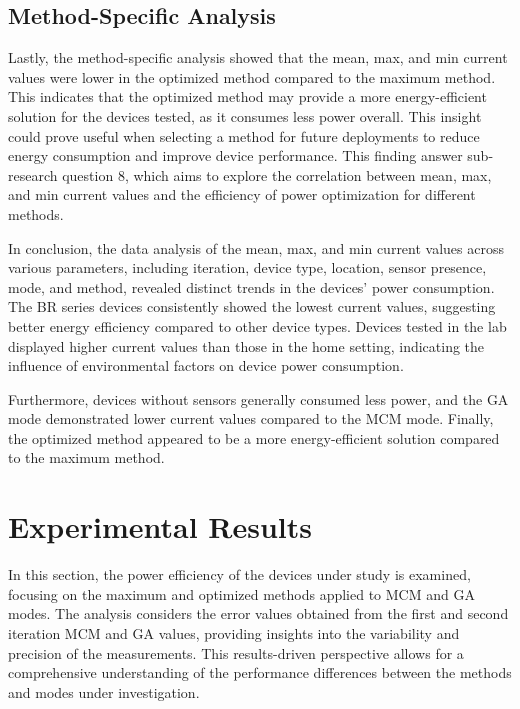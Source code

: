 \subsection{Method-Specific Analysis}

Lastly, the method-specific analysis showed that the mean, max, and min current values were lower in the optimized method compared to the maximum method. This indicates that the optimized method may provide a more energy-efficient solution for the devices tested, as it consumes less power overall. This insight could prove useful when selecting a method for future deployments to reduce energy consumption and improve device performance. This finding answer sub-research question 8, which aims to explore the correlation between mean, max, and min current values and the efficiency of power optimization for different methods.

\vspace{3mm}
In conclusion, the data analysis of the mean, max, and min current values across various parameters, including iteration, device type, location, sensor presence, mode, and method, revealed distinct trends in the devices' power consumption. The BR series devices consistently showed the lowest current values, suggesting better energy efficiency compared to other device types. Devices tested in the lab displayed higher current values than those in the home setting, indicating the influence of environmental factors on device power consumption.

Furthermore, devices without sensors generally consumed less power, and the GA mode demonstrated lower current values compared to the MCM mode. Finally, the optimized method appeared to be a more energy-efficient solution compared to the maximum method.


\section{Experimental Results}

In this section, the power efficiency of the devices under study is examined, focusing on the maximum and optimized methods applied to MCM and GA modes. The analysis considers the error values obtained from the first and second iteration MCM and GA values, providing insights into the variability and precision of the measurements. This results-driven perspective allows for a comprehensive understanding of the performance differences between the methods and modes under investigation.

